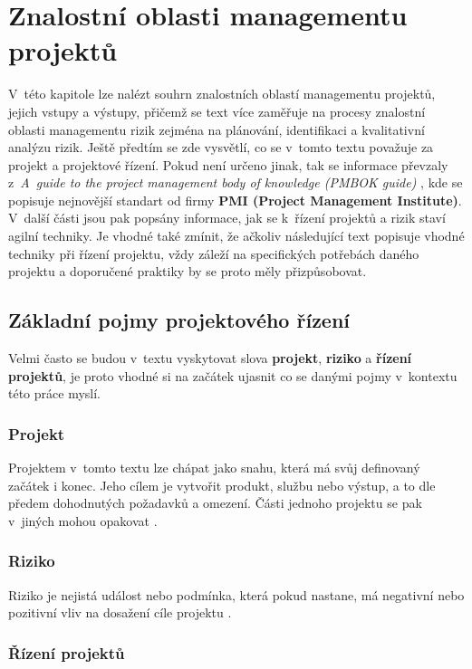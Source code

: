 \chapter{Znalostní oblasti managementu projektů}
\label{teorie}

V~této kapitole lze nalézt souhrn znalostních oblastí managementu projektů, jejich vstupy a výstupy, přičemž se text více zaměřuje na procesy znalostní oblasti managementu rizik zejména na plánování, identifikaci a kvalitativní analýzu rizik. Ještě předtím se zde vysvětlí, co se v~tomto textu považuje za projekt a projektové řízení. Pokud není určeno jinak, tak se informace převzaly z~\textit{A~guide to the project management body of knowledge (PMBOK guide)} \cite{PMBOK}, kde se popisuje nejnovější standart od firmy \textbf{PMI (Project Management Institute)}. V~další části jsou pak popsány informace, jak se k~řízení projektů a rizik staví agilní techniky. Je vhodné také zmínit, že ačkoliv následující text popisuje vhodné techniky při řízení projektu, vždy záleží na specifických potřebách daného projektu a doporučené praktiky by se proto měly přizpůsobovat.

\section{Základní pojmy projektového řízení}
Velmi často se budou v~textu vyskytovat slova \textbf{projekt}, \textbf{riziko} a \textbf{řízení projektů}, je proto vhodné si na začátek ujasnit co se danými pojmy v~kontextu této práce myslí. 

\subsection*{Projekt}

Projektem v~tomto textu lze chápat jako snahu, která má svůj definovaný začátek i konec. Jeho cílem je vytvořit produkt, službu nebo výstup, a to dle předem dohodnutých požadavků a omezení. Části jednoho projektu se pak v~jiných mohou opakovat \cite{ZaklPojmy}.

\subsection*{Riziko}

Riziko je nejistá událost nebo podmínka, která pokud nastane, má negativní nebo pozitivní vliv na dosažení cíle projektu \cite{ZaklPojmy}.

\subsection*{Řízení projektů}

